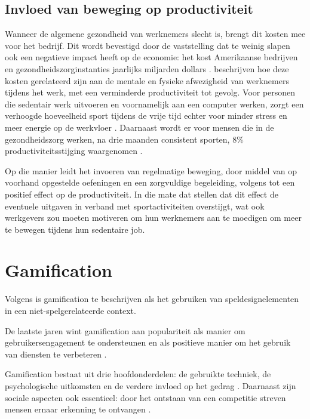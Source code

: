 \subsection{Invloed van beweging op productiviteit}
Wanneer de algemene gezondheid van werknemers slecht is, brengt dit kosten mee voor het bedrijf. Dit wordt bevestigd door de vaststelling dat te weinig slapen ook een negatieve impact heeft op de economie: het kost Amerikaanse bedrijven en gezondheidszorginstanties jaarlijks miljarden dollars \autocite{Dolezal2017}. \textcite{Sjoegaard2016} beschrijven hoe deze kosten gerelateerd zijn aan de mentale en fysieke afwezigheid van werknemers tijdens het werk, met een verminderde productiviteit tot gevolg. Voor personen die sedentair werk uitvoeren en voornamelijk aan een computer werken, zorgt een verhoogde hoeveelheid sport tijdens de vrije tijd echter voor minder stress en meer energie op de werkvloer \autocite{Hansen2009}. Daarnaast wordt er voor mensen die in de gezondheidszorg werken, na drie maanden consistent sporten, 8\% productiviteitsstijging waargenomen \autocite{Sjoegaard2016}.

Op die manier leidt het invoeren van regelmatige beweging, door middel van op voorhand opgestelde oefeningen en een zorgvuldige begeleiding, volgens \textcite{Cancelliere2011} tot een positief effect op de productiviteit. In die mate dat \textcite{Sjoegaard2016} stellen dat dit effect de eventuele uitgaven in verband met sportactiviteiten overstijgt, wat ook werkgevers zou moeten motiveren om hun werknemers aan te moedigen om meer te bewegen tijdens hun sedentaire job.

\section{Gamification}
Volgens \textcite{Deterding2011} is gamification te beschrijven als het gebruiken van speldesignelementen in een niet-spelgerelateerde context.

De laatste jaren wint gamification aan populariteit als manier om gebruikersengagement te ondersteunen en als positieve manier om het gebruik van diensten te verbeteren \autocite{Hamari2014}.

Gamification bestaat uit drie hoofdonderdelen: de gebruikte techniek, de psychologische uitkomsten en de verdere invloed op het gedrag \autocite{Hamari2014}. Daarnaast zijn sociale aspecten ook essentieel: door het ontstaan van een competitie streven mensen ernaar erkenning te ontvangen \autocite{Hamari2013}.

